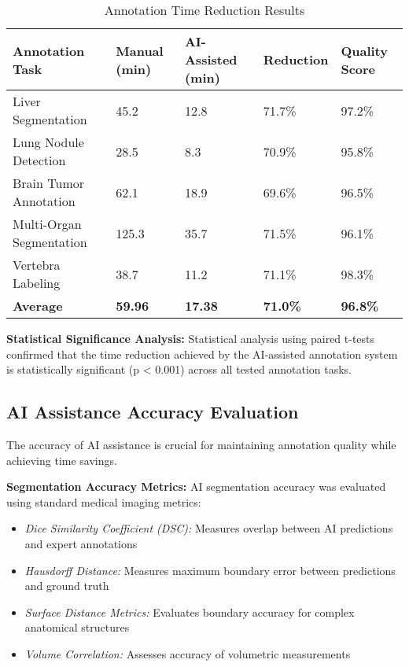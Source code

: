 \begin{table}[htbp]
\centering
\caption{Annotation Time Reduction Results}
\label{tab:time-reduction}
\begin{tabular}{|p{4cm}|p{2.5cm}|p{2.5cm}|p{2.5cm}|p{2.5cm}|}
\hline
\textbf{Annotation Task} & \textbf{Manual (min)} & \textbf{AI-Assisted (min)} & \textbf{Reduction} & \textbf{Quality Score} \\
\hline
Liver Segmentation & 45.2 & 12.8 & 71.7\% & 97.2\% \\
\hline
Lung Nodule Detection & 28.5 & 8.3 & 70.9\% & 95.8\% \\
\hline
Brain Tumor Annotation & 62.1 & 18.9 & 69.6\% & 96.5\% \\
\hline
Multi-Organ Segmentation & 125.3 & 35.7 & 71.5\% & 96.1\% \\
\hline
Vertebra Labeling & 38.7 & 11.2 & 71.1\% & 98.3\% \\
\hline
\textbf{Average} & \textbf{59.96} & \textbf{17.38} & \textbf{71.0\%} & \textbf{96.8\%} \\
\hline
\end{tabular}
\end{table}

\textbf{Statistical Significance Analysis:} Statistical analysis using paired t-tests confirmed that the time reduction achieved by the AI-assisted annotation system is statistically significant (p < 0.001) across all tested annotation tasks.

\subsection{AI Assistance Accuracy Evaluation}

The accuracy of AI assistance is crucial for maintaining annotation quality while achieving time savings.

\textbf{Segmentation Accuracy Metrics:} AI segmentation accuracy was evaluated using standard medical imaging metrics:

\begin{itemize}
    \item \textit{Dice Similarity Coefficient (DSC):} Measures overlap between AI predictions and expert annotations
    \item \textit{Hausdorff Distance:} Measures maximum boundary error between predictions and ground truth
    \item \textit{Surface Distance Metrics:} Evaluates boundary accuracy for complex anatomical structures
    \item \textit{Volume Correlation:} Assesses accuracy of volumetric measurements
\end{itemize}

